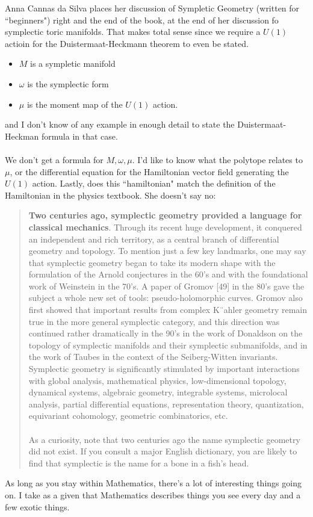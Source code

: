 \documentclass[12pt]{article}
\begin{document}
Anna Cannas da Silva places her discussion of Sympletic Geometry (written for ``beginners") right and the end of the book, at the end of her discussion fo {\color{blue}symplectic toric manifolds}.  That makes total sense since we require a $U(1)$ actioin for the Duistermaat-Heckmann theorem to even be stated.
\begin{itemize}
\item $M$ is a sympletic manifold
\item $\omega$ is the symplectic form
\item $\mu$ is the moment map of the $U(1)$ action.
\end{itemize}
and I don't know of any example in enough detail to state the Duistermaat-Heckman formula in that case.  \\ \\ We don't get a formula for $M, \omega, \mu$.  I'd like to know what the polytope relates to $\mu$, or the differential equation for the Hamiltonian vector field generating the $U(1)$ action.  Lastly, does this ``hamiltonian" match the definition of the Hamiltonian in the physics textbook.  She doesn't say no:
\begin{quotation} 
{\color{green!75!black}\textbf{Two centuries ago, symplectic geometry provided a language for classical mechanics}}.
Through its recent huge development, it conquered an independent and
rich territory, as a central branch of differential geometry and topology. To mention
just a few key landmarks, one may say that symplectic geometry began to take its
modern shape with the formulation of the Arnold conjectures in the 60’s and with
the foundational work of Weinstein in the 70’s. A paper of Gromov [49] in the 80’s
gave the subject a whole new set of tools: pseudo-holomorphic curves. Gromov also
first showed that important results from complex K¨ahler geometry remain true in the
more general symplectic category, and this direction was continued rather dramatically
in the 90’s in the work of Donaldson on the topology of symplectic manifolds
and their symplectic submanifolds, and in the work of Taubes in the context of
the Seiberg-Witten invariants. Symplectic geometry is significantly stimulated by
important interactions with {\color{orange}global analysis}, {\color{blue}mathematical physics}, {\color{orange!75!black}low-dimensional
topology}, {\color{blue}dynamical systems}, {\color{orange!50!black}algebraic geometry}, {\color{blue!50!black}integrable systems}, {\color{orange}microlocal
analysis}, {\color{blue!50!black}partial differential equations}, {\color{orange}representation theory}, {\color{blue}quantization}, {\color{orange!50!black}equivariant cohomology}, {\color{blue}geometric combinatorics}, etc. \\ \\
As a curiosity, note that two centuries ago the name symplectic geometry did
not exist. If you consult a major English dictionary, you are likely to find that
symplectic is the name for a bone in a fish's head.
\end{quotation}
As long as you stay within Mathematics, there's a lot of interesting things going on.  I take as a given that Mathematics describes things you see every day and a few exotic things.
\end{document}
